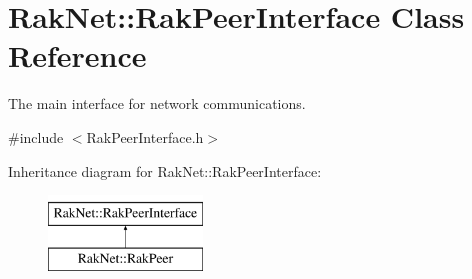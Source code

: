 \hypertarget{class_rak_net_1_1_rak_peer_interface}{\section{Rak\-Net\-:\-:Rak\-Peer\-Interface Class Reference}
\label{class_rak_net_1_1_rak_peer_interface}
}


The main interface for network communications.  




{\ttfamily \#include $<$Rak\-Peer\-Interface.\-h$>$}

Inheritance diagram for Rak\-Net\-:\-:Rak\-Peer\-Interface\-:\begin{figure}[H]
\begin{center}
\leavevmode
\includegraphics[height=2.000000cm]{class_rak_net_1_1_rak_peer_interface}
\end{center}
\end{figure}
